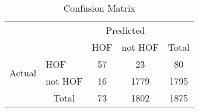 \documentclass[paper=a4, fontsize=11pt]{scrartcl} %
\numberwithin{equation}{section} %
\numberwithin{figure}{section} %
\numberwithin{table}{section} %
\begin{document}
\begin{table}[thb]
\centering
\caption{\label{initial_confusion}Confusion Matrix}
\begin{tabular}{l|l|c|c|c}
\multicolumn{2}{c}{}&\multicolumn{2}{c}{Predicted}&\\
\cline{3-4}
\multicolumn{2}{c|}{}& HOF & not HOF &\multicolumn{1}{c}{Total}\\
\cline{2-4}
\multirow{2}{*}{Actual}& HOF & 57 & 23 & 80\\
\cline{2-4}
& not HOF & 16 & 1779 & 1795\\
\cline{2-4}
\multicolumn{1}{c}{} & \multicolumn{1}{c}{Total} & \multicolumn{1}{c}{73} & \multicolumn{1}{c}{1802} & \multicolumn{1}{c}{1875}\\
\end{tabular}
\end{table}
\end{document}
